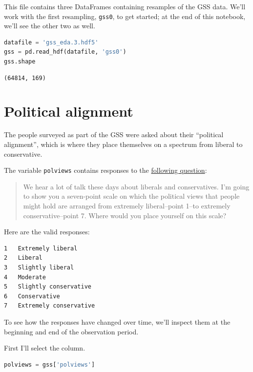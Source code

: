 This file contains three DataFrames containing resamples of the GSS
data. We'll work with the first resampling,
\passthrough{\lstinline!gss0!}, to get started; at the end of this
notebook, we'll see the other two as well.

\begin{lstlisting}[language=Python,style=source]
datafile = 'gss_eda.3.hdf5'
gss = pd.read_hdf(datafile, 'gss0')
gss.shape
\end{lstlisting}

\begin{lstlisting}[style=output]
(64814, 169)
\end{lstlisting}

\hypertarget{political-alignment}{%
\section{Political alignment}\label{political-alignment}}

The people surveyed as part of the GSS were asked about their
``political alignment'', which is where they place themselves on a
spectrum from liberal to conservative.

The variable \passthrough{\lstinline!polviews!} contains responses to
the
\href{https://gssdataexplorer.norc.org/projects/52787/variables/178/vshow}{following
question}:

\begin{quote}
We hear a lot of talk these days about liberals and conservatives. I'm
going to show you a seven-point scale on which the political views that
people might hold are arranged from extremely liberal--point 1--to
extremely conservative--point 7. Where would you place yourself on this
scale?
\end{quote}

Here are the valid responses:

\begin{lstlisting}[style=output]
1   Extremely liberal
2   Liberal
3   Slightly liberal
4   Moderate
5   Slightly conservative
6   Conservative
7   Extremely conservative
\end{lstlisting}

To see how the responses have changed over time, we'll inspect them at
the beginning and end of the observation period.

First I'll select the column.

\begin{lstlisting}[language=Python,style=source]
polviews = gss['polviews']
\end{lstlisting}

